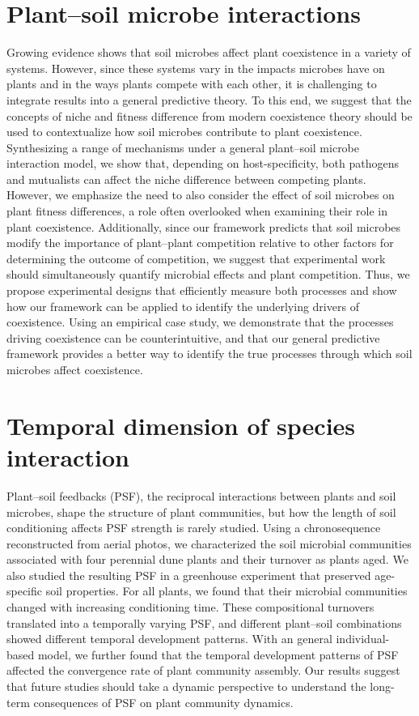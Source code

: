 \section{Plant--soil microbe interactions}
Growing evidence shows that soil microbes affect plant coexistence in a variety of systems. However, since these systems vary in the impacts microbes have on plants and in the ways plants compete with each other, it is challenging to integrate results into a general predictive theory.
To this end, we suggest that the concepts of niche and fitness difference from modern coexistence theory should be used to contextualize how soil microbes contribute to plant coexistence. Synthesizing a range of mechanisms under a general plant--soil microbe interaction model, we show that, depending on host-specificity, both pathogens and mutualists can affect the niche difference between competing plants.
However, we emphasize the need to also consider the effect of soil microbes on plant fitness differences, a role often overlooked when examining their role in plant coexistence.
Additionally, since our framework predicts that soil microbes modify the importance of plant--plant competition relative to other factors for determining the outcome of competition, we suggest that experimental work should simultaneously quantify microbial effects and plant competition. Thus, we propose experimental designs that efficiently measure both processes and show how our framework can be applied to identify the underlying drivers of coexistence. Using an empirical case study, we demonstrate that the processes driving coexistence can be counterintuitive, and that our general predictive framework provides a better way to identify the true processes through which soil microbes affect coexistence.
\par



\section{Temporal dimension of species interaction}
Plant--soil feedbacks (PSF), the reciprocal interactions between plants and soil microbes, shape the structure of plant communities, but how the length of soil conditioning affects PSF strength is rarely studied. 
Using a chronosequence reconstructed from aerial photos, we characterized the soil microbial communities associated with four perennial dune plants and their turnover as plants aged. 
We also studied the resulting PSF in a greenhouse experiment that preserved age-specific soil properties.
For all plants, we found that their microbial communities changed with increasing conditioning time.
These compositional turnovers translated into a temporally varying PSF, and different plant--soil combinations showed different temporal development patterns.
With an general individual-based model, we further found that the temporal development patterns of PSF affected the convergence rate of plant community assembly. 
Our results suggest that future studies should take a dynamic perspective to understand the long-term consequences of PSF on plant community dynamics.
\par



